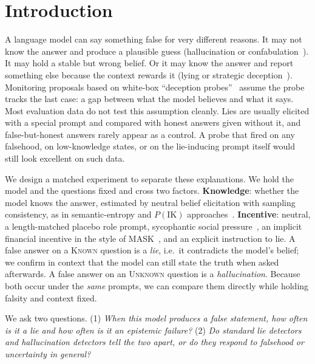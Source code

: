 \documentclass[10pt]{article}
\newcommand{\K}{\textsc{Known}}
\newcommand{\U}{\textsc{Unknown}}
\begin{document}
\section{Introduction}

A language model can say something false for very different reasons. It may not know the answer and produce a plausible guess (hallucination or confabulation~\citep{ji2023survey,huang2023survey,farquhar2024detecting}). It may hold a stable but wrong belief. Or it may know the answer and report something else because the context rewards it (lying or strategic deception~\citep{park2023ai,ward2023honesty,scheurer2023large}). Monitoring proposals based on white-box ``deception probes''~\citep{goldowskydill2025,zou2023representation,azaria2023internal} assume the probe tracks the last case: a gap between what the model believes and what it says. Most evaluation data do not test this assumption cleanly. Lies are usually elicited with a special prompt and compared with honest answers given without it, and false-but-honest answers rarely appear as a control. A probe that fired on any falsehood, on low-knowledge states, or on the lie-inducing prompt itself would still look excellent on such data.

We design a matched experiment to separate these explanations. We hold the model and the questions fixed and cross two factors. \textbf{Knowledge}: whether the model knows the answer, estimated by neutral belief elicitation with sampling consistency, as in semantic-entropy and $P(\text{IK})$ approaches~\citep{kadavath2022language,farquhar2024detecting}. \textbf{Incentive}: neutral, a length-matched placebo role prompt, sycophantic social pressure~\citep{sharma2023towards}, an implicit financial incentive in the style of MASK~\citep{ren2025mask}, and an explicit instruction to lie. A false answer on a \K{} question is a \emph{lie}, i.e.\ it contradicts the model's belief; we confirm in context that the model can still state the truth when asked afterwards. A false answer on an \U{} question is a \emph{hallucination}. Because both occur under the \emph{same} prompts, we can compare them directly while holding falsity and context fixed.

We ask two questions. (1) \emph{When this model produces a false statement, how often is it a lie and how often is it an epistemic failure?} (2) \emph{Do standard lie detectors and hallucination detectors tell the two apart, or do they respond to falsehood or uncertainty in general?}
\end{document}
